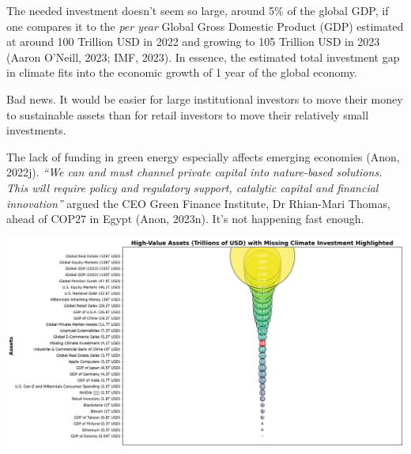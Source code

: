 \documentclass[
  letterpaper,
  DIV=11,
  numbers=noendperiod]{scrartcl}
\begin{document}
The needed investment doesn't seem so large, around 5\% of the global
GDP, if one compares it to the \emph{per year} Global Gross Domestic
Product (GDP) estimated at around 100 Trillion USD in 2022 and growing
to 105 Trillion USD in 2023 (Aaron O'Neill, 2023; IMF, 2023). In
essence, the estimated total investment gap in climate fits into the
economic growth of 1 year of the global economy.

Bad news. It would be easier for large institutional investors to move
their money to sustainable assets than for retail investors to move
their relatively small investments.

The lack of funding in green energy especially affects emerging
economies (Anon, 2022j). \emph{``We can and must channel private capital
into nature-based solutions. This will require policy and regulatory
support, catalytic capital and financial innovation''} argued the CEO
Green Finance Institute, Dr Rhian-Mari Thomas, ahead of COP27 in Egypt
(Anon, 2023n). It's not happening fast enough.

\includegraphics{_thesis_files/figure-pdf/cell-36-output-1.pdf}
\end{document}
